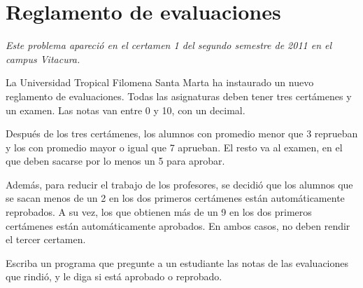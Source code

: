 \section{Reglamento de evaluaciones}

\emph{Este problema apareció en el certamen 1 del segundo semestre de
2011 en el campus Vitacura.}

La Universidad Tropical Filomena Santa Marta ha instaurado un nuevo
reglamento de evaluaciones. Todas las asignaturas deben tener tres
certámenes y un examen. Las notas van entre 0 y 10, con un decimal.

Después de los tres certámenes, los alumnos con promedio menor que 3
reprueban y los con promedio mayor o igual que 7 aprueban. El resto va
al examen, en el que deben sacarse por lo menos un 5 para aprobar.

Además, para reducir el trabajo de los profesores, se decidió que los
alumnos que se sacan menos de un 2 en los dos primeros certámenes están
automáticamente reprobados. A su vez, los que obtienen más de un 9 en
los dos primeros certámenes están automáticamente aprobados. En ambos
casos, no deben rendir el tercer certamen.

Escriba un programa que pregunte a un estudiante las notas de las
evaluaciones que rindió, y le diga si está aprobado o reprobado.
